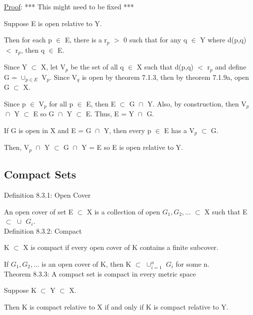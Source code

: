{ \color{magenta} \underline{Proof}: *** This might need to be fixed *** } 

	Suppose E is open relative to Y.

	Then for each p $\in$ E, there is a r$_p$ $>$ 0 such that for
	any q $\in$ Y where d(p,q) $<$ r$_p$, then q $\in$ E.
	
	Since Y $\subset$ X, let V$_p$ be the set of all q $\in$ X
	such that d(p,q) $<$ r$_p$ and define G = $\cup_{p \in E}^{}$ V$_p$.
	Since V$_q$ is open by {\color{red} theorem 7.1.3}, then by
	{\color{red} theorem 7.1.9a}, open G $\subset$ X.

	Since p $\in$ V$_p$ for all p $\in$ E, then E $\subset$ G $\cap_{}^{}$ Y.
	Also, by construction, then V$_p$ $\cap_{}^{}$ Y $\subset$ E so
	G $\cap_{}^{}$ Y $\subset$ E.
	Thus, E = Y $\cap_{}^{}$ G.

	If G is open in X and E = G $\cap_{}^{}$ Y, then every p $\in$ E has
	a V$_p$ $\subset$ G.

	Then, V$_p$ $\cap_{}^{}$ Y $\subset$ G $\cap_{}^{}$ Y = E so E is open relative to Y.
\newpage	





\subsection{ Compact Sets }

{ \color{blue} Definition 8.3.1: Open Cover } 

	\begin{adjustbox}{minipage=14cm, right, vspace=0.1cm 0cm}
		An open cover of set E $\subset$ X is a collection of open $G_1, G_2, ...$
		$\subset$ X such that E $\subset$ $\cup_{}^{}$ $G_i$. \\
	\end{adjustbox}

{ \color{blue} Definition 8.3.2: Compact } 

	\begin{adjustbox}{minipage=14cm, right, vspace=0.1cm 0cm}
		K $\subset$ X is compact if every open cover
		of K contains a finite subcover.

		\qquad If $G_1, G_2, ...$ is an open cover of K, then
		K $\subset$ $\cup_{i=1}^{n}$ $G_i$ for some n. \\
	\end{adjustbox}

{ \color{red} Theorem 8.3.3: A compact set is compact in every metric space } 

	\begin{adjustbox}{minipage=14cm, right, vspace=0.1cm 0cm}
		Suppose K $\subset$ Y $\subset$ X.

		Then K is compact relative to X if and only if K is
		compact relative to Y.
	\end{adjustbox}

